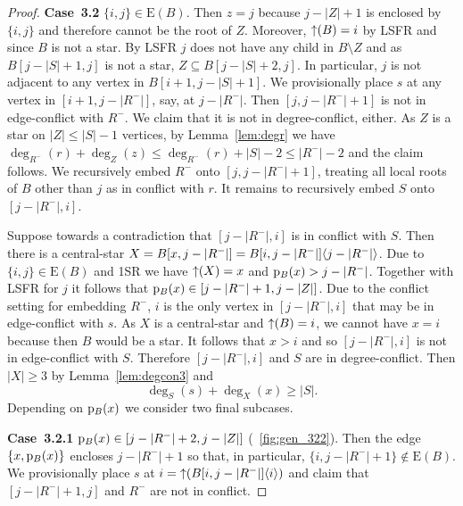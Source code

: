 \documentclass[11pt,a4paper,colorlinks=true,urlcolor=blue,citecolor=red]{article}
\theoremstyle{plain}
\newcommand{\case}[1]{\par\vspace{.5\baselineskip}\noindent\textbf{\sffamily Case~#1}}
\newcommand{\EB}{\mathrm{E}(B)}
\begin{document}
\begin{proof}
  \case{3.2} $\{i,j\}\in\EB$. Then $z=j$ because $j-|Z|+1$ is enclosed
  by $\{i,j\}$ and therefore cannot be the root of $Z$. Moreover,
  $\mathop{\uparrow}(B)=i$ by LSFR and since $B$ is not a star. By LSFR $j$ does
  not have any child in $B\setminus Z$ and as $B[j-|S|+1,j]$ is not a
  star, $Z\subseteq B[j-|S|+2,j]$. In particular, $j$ is not adjacent to
  any vertex in $B[i+1,j-|S|+1]$. We provisionally place $s$ at any
  vertex in $[i+1,j-|R^-|]$, say, at $j-|R^-|$. Then $[j,j-|R^-|+1]$ is
  not in edge-conflict with $R^-$. We claim that it is not in
  degree-conflict, either. As $Z$ is a star on $|Z|\le|S|-1$ vertices,
  by Lemma~\ref{lem:degr} we have
  $\deg_{R^-}(r)+\deg_Z(z)\le\deg_{R^-}(r)+|S|-2\le|R^-|-2$ and the
  claim follows. We recursively embed $R^-$ onto $[j,j-|R^-|+1]$,
  treating all local roots of $B$ other than $j$ as in conflict with
  $r$. It remains to recursively embed $S$ onto $[j-|R^-|,i]$.

  Suppose towards a contradiction that $[j-|R^-|,i]$ is in conflict with
  $S$. Then there is a central-star $X=B[x,j-|R^-|]=B{[i,j-|R^-|]}\langle{j-|R^-|}\rangle$.
  Due to $\{i,j\}\in\EB$ and 1SR we have $\mathop{\uparrow}(X)=x$ and $\mathrm p_B(x)>j-|R^-|$.
  Together with LSFR for $j$ it follows that
  $\mathrm p_B(x)\in[j-|R^-|+1,j-|Z|]$. Due to the conflict setting for
  embedding $R^-$, $i$ is the only vertex in $[j-|R^-|,i]$ that may be
  in edge-conflict with $s$. As $X$ is a central-star and
  $\mathop{\uparrow}(B)=i$, we cannot have $x=i$ because then $B$ would be a star.
  It follows that $x>i$ and so $[j-|R^-|,i]$ is not in edge-conflict
  with $S$. Therefore $[j-|R^-|,i]$ and $S$ are in degree-conflict.
  Then $|X|\ge 3$ by Lemma~\ref{lem:degcon3} and
\begin{equation}\label{eq:degcon4}
    \deg_S(s)+\deg_X(x)\ge|S|.
  \end{equation}
Depending on $\mathrm p_B(x)$ we consider two final subcases.

  \case{3.2.1} $\mathrm p_B(x)\in[j-|R^-|+2,j-|Z|]$
  (\figurename~\ref{fig:gen_322}). Then the edge $\{x,\mathrm p_B(x)\}$
  encloses $j-|R^-|+1$ so that, in particular,
  $\{i,j-|R^-|+1\}\notin\EB$. We provisionally place $s$ at
  $i=\mathop{\uparrow}(B{[i,j-|R^-|]}\langle{i}\rangle)$ and claim that $[j-|R^-|+1,j]$
  and $R^-$ are not in conflict.


\end{proof}
\end{document}
